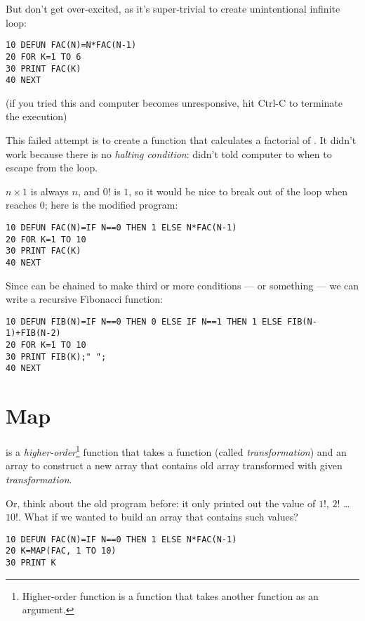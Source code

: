 But don't get over-excited, as it's super-trivial to create unintentional infinite loop:

\begin{lstlisting}
10 DEFUN FAC(N)=N*FAC(N-1)
20 FOR K=1 TO 6
30 PRINT FAC(K)
40 NEXT
\end{lstlisting}

(if you tried this and computer becomes unresponsive, hit Ctrl-C to terminate the execution)

This failed attempt is to create a function that calculates a factorial of . It didn't work because there is no \emph{halting condition}: didn't told computer to when to escape from the loop.

$n \times 1$ is always $n$, and $0!$ is $1$, so it would be nice to break out of the loop when  reaches $0$; here is the modified program:

\begin{lstlisting}
10 DEFUN FAC(N)=IF N==0 THEN 1 ELSE N*FAC(N-1)
20 FOR K=1 TO 10
30 PRINT FAC(K)
40 NEXT
\end{lstlisting}

Since  can be chained to make third or more conditions ---  or something --- we can write a recursive Fibonacci function:

\begin{lstlisting}
10 DEFUN FIB(N)=IF N==0 THEN 0 ELSE IF N==1 THEN 1 ELSE FIB(N-1)+FIB(N-2)
20 FOR K=1 TO 10
30 PRINT FIB(K);" ";
40 NEXT
\end{lstlisting}

\section[MAPping]{Map}

 is a \emph{higher-order}\footnote{Higher-order function is a function that takes another function as an argument.} function that takes a function (called \emph{transformation}) and an array to construct a new array that contains old array transformed with given \emph{transformation}.

Or, think about the old  program before: it only printed out the value of $1!$, $2!$ \ldots\ $10!$. What if we wanted to build an array that contains such values?

\begin{lstlisting}
10 DEFUN FAC(N)=IF N==0 THEN 1 ELSE N*FAC(N-1)
20 K=MAP(FAC, 1 TO 10)
30 PRINT K
\end{lstlisting}


